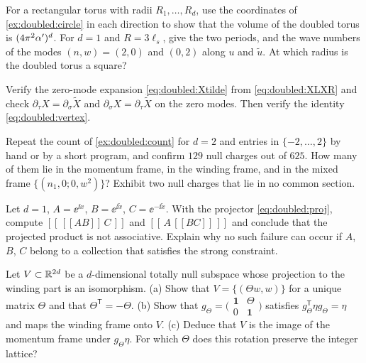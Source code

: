 \begin{exercise}[$\star$]
For a rectangular torus with radii $R_1,\dots,R_d$, use the coordinates of
\cref{ex:doubled:circle} in each direction to show that the volume of the doubled torus is
$(4\pi^2\alpha')^d$. For $d=1$ and $R=3\ell_s$, give the two periods, and the wave numbers of the
modes $(n,w)=(2,0)$ and $(0,2)$ along $u$ and $\tilde u$. At which radius is the doubled torus
a square?
\end{exercise}

\begin{exercise}[$\star$]
Verify the zero-mode expansion \eqref{eq:doubled:Xtilde} from \eqref{eq:doubled:XLXR} and check
$\partial_\tau X=\partial_\sigma\tilde X$ and $\partial_\sigma X=\partial_\tau\tilde X$ on the
zero modes. Then verify the identity \eqref{eq:doubled:vertex}.
\end{exercise}

\begin{exercise}[$\star\star$]
Repeat the count of \cref{ex:doubled:count} for $d=2$ and entries in $\{-2,\dots,2\}$ by hand
or by a short program, and confirm $129$ null charges out of $625$. How many of them lie in the
momentum frame, in the winding frame, and in the mixed frame $\{(n_1,0;0,w^2)\}$? Exhibit two
null charges that lie in no common section.
\end{exercise}

\begin{exercise}[$\star\star$]\label{ex:doubled:nonassoc}
Let $d=1$, $A=\ee^{\ii x}$, $B=\ee^{\ii\tilde x}$, $C=\ee^{-\ii\tilde x}$. With the projector
\eqref{eq:doubled:proj}, compute $[[\,[[AB]]\,C\,]]$ and $[[\,A\,[[BC]]\,]]$ and conclude that
the projected product is not associative. Explain why no such failure can occur if $A$, $B$,
$C$ belong to a collection that satisfies the strong constraint.
\end{exercise}

\begin{exercise}[$\star\star$]\label{ex:doubled:graph}
Let $V\subset\mathbb{R}^{2d}$ be a $d$-dimensional totally null subspace whose projection to the
winding part is an isomorphism. (a) Show that $V=\{(\Theta w,w)\}$ for a unique matrix $\Theta$
and that $\Theta^{\mathsf T}=-\Theta$. (b) Show that $g_\Theta=\bigl(\begin{smallmatrix}\mathbf
1&\Theta\\0&\mathbf 1\end{smallmatrix}\bigr)$ satisfies $g_\Theta^{\mathsf T}\eta g_\Theta=\eta$
and maps the winding frame onto $V$. (c) Deduce that $V$ is the image of the momentum frame
under $g_\Theta\eta$. For which $\Theta$ does this rotation preserve the integer lattice?
\end{exercise}

